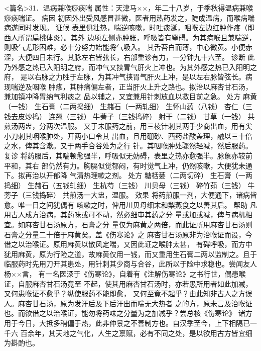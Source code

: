 \documentclass[a4paper,12pt,UTF8,twoside]{ctexbook}
\begin{document}
<篇名>31．温病兼喉痧痰喘
属性：天津马××，年二十八岁，于季秋得温病兼喉痧痰喘证。 
病因 初因外出受风感冒甚微，医者用热药发之，陡成温病，而喉病喘病遂同时发现。 
证候 表里俱壮热，喘逆咳嗽，时吐痰涎，咽喉左边红肿作疼（即西人所谓扁桃体炎）。其外 
边项左侧亦肿胀，呼吸皆有窒碍。为其病喉且兼喘逆，则吸气尤形困难，必十分努力始能将气吸入。 
其舌苔白而薄，中心微黄。小便赤涩，大便四日未行。其脉左右皆弦长，右部重诊有力，一分钟九十六至。 
诊断 此乃外感之热已入阳明之府，而冲气又挟胃气肝火上冲也。为其外感之热已入阳明之府， 
是以右脉之力胜于左脉，为其冲气挟胃气肝火上冲，是以左右脉皆弦长。病现喘逆及咽喉 
肿疼，其肿痛偏左者，正当肝火上升之路也。拟治以麻杏甘石汤，兼加镇冲降胃纳气利痰之 
品以辅之，又宜兼用针刺放血以救目前之急。 
处方 麻黄（一钱） 生石膏（二两捣细） 生赭石（一两轧细） 生怀山药（八钱） 
杏仁（三钱去皮炒捣） 连翘（三钱） 牛蒡子（三钱捣碎） 射干（二钱） 甘草（一钱） 
共煎汤两盅，分两次温服。 
又于未服药之前，用三棱针刺其两手少商出血，用有尖小刀刺其咽喉肿处，开两小口令其 
出血，且用硼砂、西药盐酸盖理，融以三十倍之水，俾其含漱。又于两手合谷处为之行 
针。其咽喉肿处骤然轻减，然后服药。 
复诊 将药服后，其喘顿愈强半，呼吸似无妨碍，表里之热亦愈强半。脉象亦较前平和，其右 
部仍然有力。胸膈似觉郁闷，有时觉气上冲，仍然咳嗽，大便犹未通下。拟再治以开郁降 
气清热理嗽之剂。 
处方 糖栝蒌（二两切碎） 生石膏（一两捣细） 生赭石（五钱轧细） 生杭芍（三钱） 
川贝母（三钱） 碎竹茹（三钱） 牛蒡子（三钱捣碎） 
共煎汤一大盅，温服。 
效果 将药煎服一剂，大便通下，诸病皆愈。唯一日之间犹偶有 
咳嗽之时，俾用川贝母细末和梨蒸食之以善其后。 
帮助 凡用古人成方治病，其药味或可不动，然必细审其药之分 
量或加或减，俾与病机相宜。如麻杏甘石汤原方，石膏之分 
量仅为麻黄之两倍，而此证所用麻杏甘石汤则石膏之分量二十倍于麻黄矣。盖《伤寒论》之 
麻杏甘石汤原非为治喉证而设，今借之以治喉证。原用麻黄以散风定喘，又因此证之喉肿太甚， 
有碍呼吸，而方中犹用麻黄，原为行险之道，故麻黄仅用一钱，而又重用生石膏二两以监制之。且于 
临服药时先用刀开其患处，用针刺其少商与合谷，此所以于险中求稳也。尝闻友人杨××言， 
有一名医深于《伤寒论》，自着有《注解伤寒论》之书行世，偶患喉证，自服麻杏甘石汤竟至 
不起，使其用麻杏甘石汤时，亦若愚所用者如此加减，又何患喉证不愈乎？纵使服药不能即愈， 
又何至竟不起乎？由此知非古人之方误人。麻杏甘石汤，原为发汗后及下后汗出而喘无大热者 
之的方，原未言及治喉证也。而欲借之以治喉证，能勿将药味之分量为之加减乎？尝总核《伤寒论》 
诸方用于今日，大抵多稍偏于热，此非仲景之不善制方也。自汉季至今，上下相隔已一千六 
百余年，其天地之气化，人生之禀赋，必有不同之处，是以欲用古方皆宜细为斟酌也。 
\end{document}
